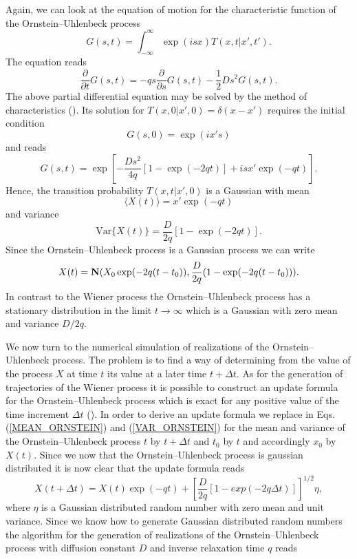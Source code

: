 Again, we can look at the equation of motion for the characteristic
function of the Ornstein--Uhlenbeck process
\begin{equation*}
G(s,t) = \int_{-\infty}^{\infty} \exp(isx) T(x,t|x',t').
\end{equation*}
The equation reads
\begin{equation*}
\frac{\partial}{\partial t}G(s,t) = -qs \frac{\partial}{\partial s} 
G(s,t) - \frac{1}{2} Ds^2 G(s,t).
\end{equation*}
The above partial differential equation may be solved by the 
method of characteristics (\cite{GARDINER}). Its solution
for $T(x,0|x',0)=\delta(x-x')$ requires the
initial condition 
\begin{equation*}
G(s,0) = \exp(ix's)
\end{equation*}
and reads
\begin{equation*}
G(s,t) = \exp\left[ -\frac{Ds^2}{4q}[1-\exp(-2qt)] + isx'\exp(-qt) 
\right].
\end{equation*}
Hence, the transition probability $T(x,t|x',0)$ is a Gaussian
with mean
\begin{equation}
\label{MEAN_ORNSTEIN}
\langle X(t) \rangle = x'\exp(-qt)
\end{equation}
and variance
\begin{equation}
\label{VAR_ORNSTEIN}
\text{Var} \{ X(t) \} = \frac{D}{2q} [1- \exp(-2qt)].
\end{equation}
Since the Ornstein--Uhlenbeck process is a Gaussian process we can write
\begin{equation*}
X(t) = {\bf N}(X_0\exp(-2q(t-t_0)), 
     \frac{D}{2q} (1-\exp(-2q(t-t_0)) ).
\end{equation*}
In contrast to the Wiener process the Ornstein--Uhlenbeck process
has a stationary distribution in the limit $t\longrightarrow \infty$
which is a Gaussian with zero mean and variance $D/2q$.



We now turn to the numerical simulation of realizations of the 
Ornstein--Uhlenbeck process. The problem is to find a way of
determining  from the value of the process $X$ at time $t$
its value at a later time $t+\Delta t$. As for the generation of 
trajectories of the Wiener process it is possible to construct
an update formula for the Ornstein--Uhlenbeck process which is 
exact for any positive value of the time increment $\Delta t$
(\cite{GILLESPIE96}). In order to derive an update formula we
replace in Eqs. (\ref{MEAN_ORNSTEIN}) and (\ref{VAR_ORNSTEIN})
for the mean and variance of the Ornstein--Uhlenbeck process
$t$ by $t+\Delta t$ and $t_0$ by $t$ and accordingly $x_0$ by
$X(t)$. Since we now that the Ornstein--Uhlenbeck process
is gaussian distributed it is now clear that the update
formula reads
\begin{equation}
X(t+\Delta t) = X(t) \exp(-qt) 
+ \left[ \frac{D}{2q} [1-exp(-2q\Delta t)] \right]^{1/2} \eta,
\end{equation}
where $\eta$ is a Gaussian distributed random number with zero 
mean and unit variance. Since we know how to generate Gaussian 
distributed random numbers the algorithm for the generation of 
realizations of the Ornstein--Uhlenbeck process with diffusion constant
$D$ and inverse relaxation time $q$ reads

